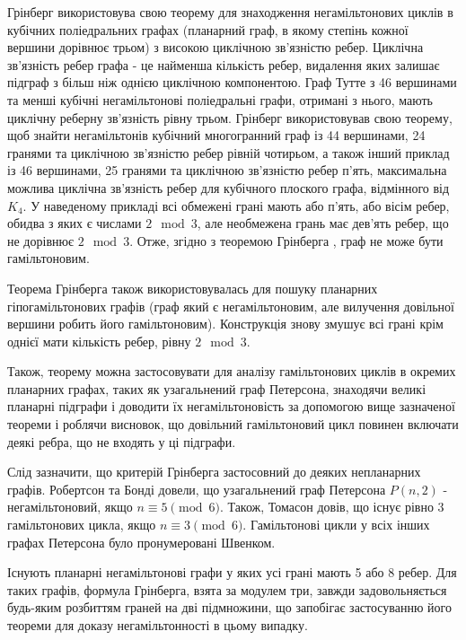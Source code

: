 \documentclass[14pt]{article}
\begin{document}
\begin{spacing}{1.175}
            Грінберг використовува свою теорему для знаходження негамільтонових циклів в кубічних поліедральних графах (планарний граф, в якому степінь кожної вершини дорівнює трьом) з високою циклічною зв'язністю ребер. Циклічна зв'язність ребер графа - це найменша кількість ребер, видалення яких залишає підграф з більш ніж однією циклічною компонентою. Граф Тутте з 46 вершинами та менші кубічні негамільтонові поліедральні графи, отримані з нього, мають циклічну реберну зв’язність рівну трьом. Грінберг використовував свою теорему, щоб знайти негамільтонів кубічний многогранний граф із 44 вершинами, 24 гранями та циклічною зв’язністю ребер рівній чотирьом, а також інший приклад із 46 вершинами, 25 гранями та циклічною зв’язністю ребер п’ять, максимальна можлива циклічна зв’язність ребер для кубічного плоского графа, відмінного від \(K_4\). У наведеному прикладі всі обмежені грані мають або п’ять, або вісім ребер, обидва з яких є числами \( 2 \mod 3\), але необмежена грань має дев’ять ребер, що не дорівнює \( 2 \mod 3\). Отже, згідно з теоремою Грінберга , граф не може бути гамільтоновим.

            Теорема Грінберга також використовувалась для пошуку планарних гіпогамільтонових графів (граф який є негамільтоновим, але вилучення довільної вершини робить його гамільтоновим). Конструкція знову змушує всі грані крім однієї мати кількість ребер, рівну \( 2 \mod 3\). 

            Також, теорему можна застосовувати для аналізу гамільтонових циклів в окремих планарних графах, таких як узагальнений граф Петерсона, знаходячи великі планарні підграфи і доводити їх негамільтоновість за допомогою вище зазначеної теореми і роблячи висновок, що довільний гамільтоновий цикл повинен включати деякі ребра, що не входять у ці підграфи.

            Слід зазначити, що критерій Грінберга застосовний до деяких непланарних графів. Робертсон та Бонді довели, що узагальнений граф Петерсона \(P(n,2)\) - негамільтоновий, якщо \( n \equiv 5 \pmod{6}\). Також, Томасон довів, що існує рівно 3 гамільтонових цикла, якщо \( n \equiv 3 \pmod 6\). Гамільтонові цикли у всіх інших графах Петерсона було пронумеровані Швенком.

            Існують планарні негамільтонові графи у яких усі грані мають 5 або 8 ребер. Для таких графів, формула Грінберга, взята за модулем три, завжди задовольняється будь-яким розбиттям граней на дві підмножини, що запобігає застосуванню його теореми для доказу негамільтонності в цьому випадку.


\end{spacing}
\end{document}

